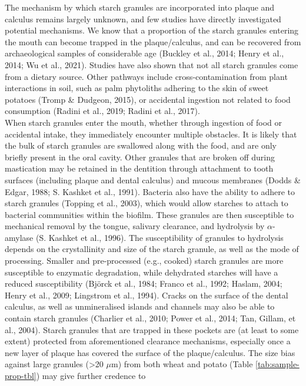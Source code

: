 \documentclass[
]{article}
\begin{document}
The mechanism by which starch granules are incorporated into plaque and calculus
remains largely unknown, and few studies have directly investigated potential
mechanisms. We know that a proportion of the starch granules entering
the mouth can become trapped in the plaque/calculus, and can be recovered from
archaeological samples of considerable age
(Buckley et al., 2014; Henry et al., 2014; Wu et al., 2021).
Studies have also shown that not all starch granules come from a dietary source.
Other pathways include cross-contamination from plant interactions in soil, such
as palm phytoliths adhering to the skin of sweet potatoes
(Tromp \& Dudgeon, 2015),
or accidental ingestion not related to food consumption
(Radini et al., 2019; Radini et al., 2017).\\
When starch granules enter the mouth, whether through ingestion of food or accidental
intake, they immediately encounter multiple obstacles. It is likely
that the bulk of starch granules are swallowed along with the food, and are
only briefly present in the oral cavity. Other granules that are broken off
during mastication may be retained in the dentition through attachment to
tooth surfaces (including plaque and dental calculus) and mucous membranes
(Dodds \& Edgar, 1988; S. Kashket et al., 1991).
Bacteria also have the ability to adhere to starch granules
(Topping et al., 2003),
which would allow starches to attach to bacterial communities within the biofilm.
These granules are then
susceptible to mechanical removal by the tongue, salivary clearance, and hydrolysis
by \(\alpha\)-amylase (S. Kashket et al., 1996).
The susceptibility of granules to hydrolysis depends on the crystallinity and size
of the starch granule, as well as the mode of processing. Smaller and pre-processed
(e.g., cooked) starch granules are more susceptible to enzymatic degradation,
while dehydrated starches will have a reduced susceptibility
(Björck et al., 1984; Franco et al., 1992; Haslam, 2004; Henry et al., 2009; Lingstrom et al., 1994).
Cracks on the surface of the dental calculus, as well as unmineralised islands
and channels may also be able to contain starch granules
(Charlier et al., 2010; Power et al., 2014; Tan, Gillam, et al., 2004).
Starch granules that are trapped in these pockets are (at least to some extent)
protected from aforementioned clearance mechanisms, especially once
a new layer of plaque has covered the surface of the plaque/calculus.
The size bias against large granules (\textgreater20 \(\mu\)m) from both wheat and potato
(Table \ref{tab:sample-prop-tbl}) may give further credence to
\end{document}

